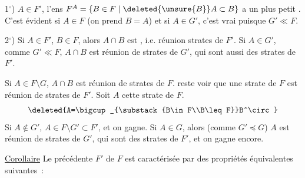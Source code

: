 1$^\circ$) \deleted{$\forall$} $A\in F'$, l'ens $F^A=\{B\in F\mid \deleted{\unsure{B}}A\subset B\}$ a un plus petit . C'est évident si $A\in F$  (on prend $B=A$) et si $A\in G'$, c'est vrai puisque $G'\ll F$.

2$^\circ$) Si $A\in F'$, $B\in F$, alors $A\cap B$ est , i.e. réunion  strates de $F'$. Si $A\in G'$, comme $G'\ll F$, $A\cap B$ est réunion de strates de $G'$, qui sont aussi des strates de $F'$.


Si $A\in F\setminus G$, $A\cap B$ est réunion de strates de $F$.  reste  voir que une strate  de $F$ est réunion de strates de $F'$. Soit $A$ cette strate de $F$. 
\[
 \deleted{A=\bigcup_{\substack{B\in F\\B\leq F}}B^\circ}
\]
Si $A\notin G'$,  $A\in F\setminus G'\subset F'$, et on gagne. Si $A\in G$, alors (comme $G'\preceq G$) $A$ est réunion de strates de $G'$, qui sont des strates de $F'$, et on gagne encore.

\uline{Corollaire} Le  précédente $F'$ de $F$ est caractérisée par  des  propriétés équivalentes suivantes~:

